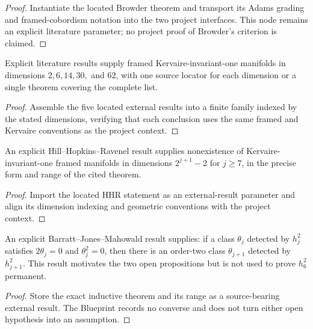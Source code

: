 \begin{proof}
  Instantiate the located Browder theorem and transport its Adams grading and
  framed-cobordism notation into the two project interfaces.  This node remains
  an explicit literature parameter; no project proof of Browder's criterion is
  claimed.
\end{proof}

\begin{theorem}
  \label{thm:external-low-kervaire-existence}
  \notready
  Explicit literature results supply framed Kervaire-invariant-one manifolds
  in dimensions $2,6,14,30,$ and $62$, with one source locator for each
  dimension or a single theorem covering the complete list.
\end{theorem}

\begin{proof}
  Assemble the five located external results into a finite family indexed by
  the stated dimensions, verifying that each conclusion uses the same framed
  and Kervaire conventions as the project context.
\end{proof}

\begin{theorem}
  \label{thm:external-hhr-nonexistence}
  \notready
  An explicit Hill--Hopkins--Ravenel result supplies nonexistence of
  Kervaire-invariant-one framed manifolds in dimensions
  $2^{j+1}-2$ for $j\ge7$, in the precise form and range of the cited theorem.
\end{theorem}

\begin{proof}
  Import the located HHR statement as an external-result parameter and align
  its dimension indexing and geometric conventions with the project context.
\end{proof}

\begin{theorem}
  \label{thm:external-bjm-induction}
  \notready
  An explicit Barratt--Jones--Mahowald result supplies: if a class $\theta_j$
  detected by $h_j^2$ satisfies $2\theta_j=0$ and $\theta_j^2=0$, then there is
  an order-two class $\theta_{j+1}$ detected by $h_{j+1}^2$.  This result
  motivates the two open propositions but is not used to prove
  $h_6^2$ permanent.
\end{theorem}

\begin{proof}
  Store the exact inductive theorem and its range as a source-bearing external
  result.  The Blueprint records no converse and does not turn either open
  hypothesis into an assumption.
\end{proof}
